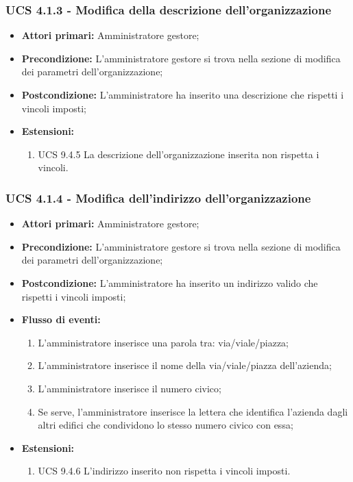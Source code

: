 \subsubsection{UCS 4.1.3 - Modifica della descrizione dell'organizzazione}%
\begin{itemize}
\item \textbf{Attori primari:} Amministratore gestore;
\item \textbf{Precondizione:} L'amministratore gestore si trova nella sezione di modifica dei parametri dell'organizzazione;
\item \textbf{Postcondizione:} L'amministratore ha inserito una descrizione che rispetti i vincoli imposti;
\item \textbf{Estensioni:}
\begin{enumerate}
    \item UCS 9.4.5 La descrizione dell'organizzazione inserita non rispetta i vincoli.
\end{enumerate}
\end{itemize}

\subsubsection{UCS 4.1.4 - Modifica dell'indirizzo dell'organizzazione}%

\begin{itemize}
\item \textbf{Attori primari:} Amministratore gestore;
\item \textbf{Precondizione:} L'amministratore gestore si trova nella sezione di modifica dei parametri dell'organizzazione;
\item \textbf{Postcondizione:} L'amministratore ha inserito un indirizzo valido che rispetti i vincoli imposti;
\item \textbf{Flusso di eventi:}
\begin{enumerate}
    \item L'amministratore inserisce una parola tra: via/viale/piazza;
    \item L'amministratore inserisce il nome della via/viale/piazza dell'azienda;
    \item L'amministratore inserisce il numero civico;
    \item Se serve, l'amministratore inserisce la lettera che identifica l'azienda dagli altri edifici che condividono lo stesso numero civico con essa;
\end{enumerate}
\item \textbf{Estensioni:}
\begin{enumerate}
    \item UCS 9.4.6 L'indirizzo inserito non rispetta i vincoli imposti.
\end{enumerate}
\end{itemize}

